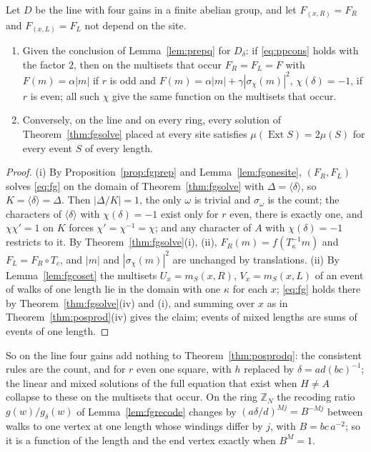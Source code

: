 \begin{theorem}\label{thm:fgline}
Let $D$ be the line with four gains in a finite abelian group, and let $F_{(x,R)}=F_R$ and $F_{(x,L)}=F_L$ not depend on the site.
\begin{enumerate}[label=(\roman*)]
\item Given the conclusion of Lemma~\ref{lem:prepq} for $D_\delta$: if \eqref{eq:ppcons} holds with the factor $2$, then on the multisets that occur $F_R=F_L=F$ with $F(m)=\alpha|m|$ if $r$ is odd and $F(m)=\alpha|m|+\gamma|\sigma_\chi(m)|^2$, $\chi(\delta)=-1$, if $r$ is even; all such $\chi$ give the same function on the multisets that occur.
\item Conversely, on the line and on every ring, every solution of Theorem~\ref{thm:fgsolve} placed at every site satisfies $\mu(\operatorname{Ext}S)=2\mu(S)$ for every event $S$ of every length.
\end{enumerate}
\end{theorem}
\begin{proof}
(i) By Proposition~\ref{prop:fgprep} and Lemma~\ref{lem:fgonesite}, $(F_R,F_L)$ solves \eqref{eq:fg} on the domain of Theorem~\ref{thm:fgsolve} with $\Delta=\langle\delta\rangle$, so $K=\langle\delta\rangle=\Delta$. Then $|\Delta/K|=1$, the only $\omega$ is trivial and $\sigma_\omega$ is the count; the characters of $\langle\delta\rangle$ with $\chi(\delta)=-1$ exist only for $r$ even, there is exactly one, and $\chi\chi'=1$ on $K$ forces $\chi'=\chi^{-1}=\chi$; and any character of $A$ with $\chi(\delta)=-1$ restricts to it. By Theorem~\ref{thm:fgsolve}(i), (ii), $F_R(m)=f(T_\kappa^{-1}m)$ and $F_L=F_R\circ T_c$, and $|m|$ and $|\sigma_\chi(m)|^2$ are unchanged by translations. (ii) By Lemma~\ref{lem:fgcoset} the multisets $U_x=m_S(x,R)$, $V_x=m_S(x,L)$ of an event of walks of one length lie in the domain with one $\kappa$ for each $x$; \eqref{eq:fg} holds there by Theorem~\ref{thm:fgsolve}(iv) and (i), and summing over $x$ as in Theorem~\ref{thm:posprod}(iv) gives the claim; events of mixed lengths are sums of events of one length.
\end{proof}

So on the line four gains add nothing to Theorem~\ref{thm:posprodq}: the consistent rules are the count, and for $r$ even one square, with $h$ replaced by $\delta=ad(bc)^{-1}$; the linear and mixed solutions of the full equation that exist when $H\ne A$ collapse to these on the multisets that occur. On the ring $\mathbb{Z}_N$ the recoding ratio $g(w)/g_\delta(w)$ of Lemma~\ref{lem:fgrecode} changes by $(a\delta/d)^{Mj}=B^{-Mj}$ between walks to one vertex at one length whose windings differ by $j$, with $B=bc\,a^{-2}$; so it is a function of the length and the end vertex exactly when $B^{M}=1$.

